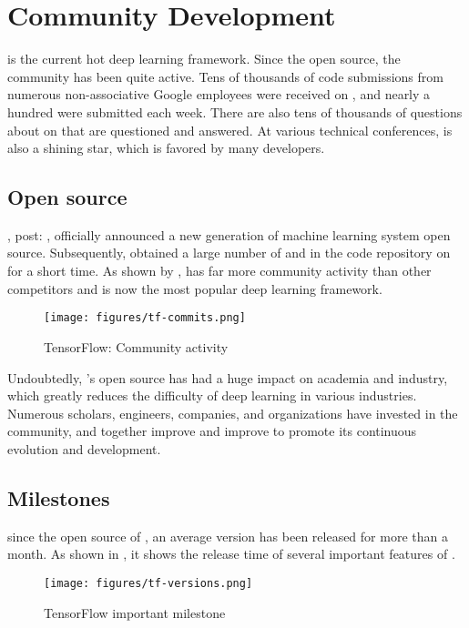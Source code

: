 \section{Community Development}
\begin{content}
\tf{} is the current hot deep learning framework. Since the open source, the \tf{} community has been quite active. Tens of thousands of code submissions from numerous non-associative {Google} employees were received on , and nearly a hundred  were submitted each week. There are also tens of thousands of questions about \tf{} on  that are questioned and answered. At various technical conferences, \tf{} is also a shining star, which is favored by many developers.


\subsection{Open source}
,  post: , officially announced a new generation of machine learning system  open source. Subsequently,  obtained a large number of  and  in the code repository on  for a short time. As shown by ,  has far more community activity than other competitors and is now the most popular deep learning framework.
\begin{figure}[H]
  \centering
  \texttt{[image: figures/tf-commits.png]}
  \caption{TensorFlow: Community activity}
  \label{fig:tf-commits}
\end{figure}

Undoubtedly, 's open source has had a huge impact on academia and industry, which greatly reduces the difficulty of deep learning in various industries. Numerous scholars, engineers, companies, and organizations have invested in the  community, and together improve and improve  to promote its continuous evolution and development.


\subsection{Milestones}
\tf{} since the open source of , an average version has been released for more than a month. As shown in , it shows the release time of several important features of \tf{}.
\begin{figure}[!htbp]
  \centering
  \texttt{[image: figures/tf-versions.png]}
  \caption{TensorFlow important milestone}
  \label{fig:tf-versions}
\end{figure}



\end{content}
